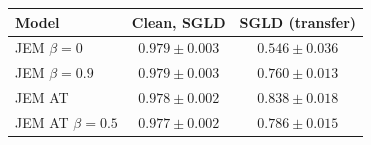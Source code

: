\begin{tabular}{lcc}
\toprule
Model & Clean, SGLD & SGLD (transfer) \\
\midrule
JEM $\beta=0$ & $0.979 \pm 0.003$ & $0.546 \pm 0.036$ \\
JEM $\beta=0.9$ & $0.979 \pm 0.003$ & $0.760 \pm 0.013$ \\
JEM AT & $0.978 \pm 0.002$ & $\mathbf{0.838 \pm 0.018}$ \\
JEM AT $\beta=0.5$ & $0.977 \pm 0.002$ & $0.786 \pm 0.015$ \\
\bottomrule
\end{tabular}
